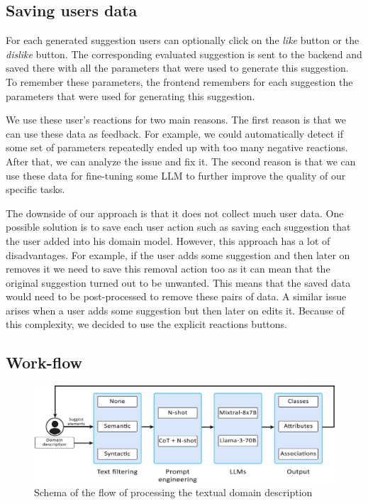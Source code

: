 \subsection{Saving users data}

For each generated suggestion users can optionally click on the \textit{like} button or the \textit{dislike} button. The corresponding evaluated suggestion is sent to the backend and saved there with all the parameters that were used to generate this suggestion. To remember these parameters, the frontend remembers for each suggestion the parameters that were used for generating this suggestion.

We use these user's reactions for two main reasons. The first reason is that we can use these data as feedback. For example, we could automatically detect if some set of parameters repeatedly ended up with too many negative reactions. After that, we can analyze the issue and fix it. The second reason is that we can use these data for fine-tuning some LLM to further improve the quality of our specific tasks.

The downside of our approach is that it does not collect much user data. One possible solution is to save each user action such as saving each suggestion that the user added into his domain model. However, this approach has a lot of disadvantages. For example, if the user adds some suggestion and then later on removes it we need to save this removal action too as it can mean that the original suggestion turned out to be unwanted. This means that the saved data would need to be post-processed to remove these pairs of data. A similar issue arises when a user adds some suggestion but then later on edits it. Because of this complexity, we decided to use the explicit reactions buttons.


\subsection{Work-flow}

\begin{figure}[!h]
    \centering
    \includegraphics[scale=0.23]{img/work-flow.jpg}
    \caption{\centering Schema of the flow of processing the textual domain description}
    \label{fig:work-flow}
\end{figure}

